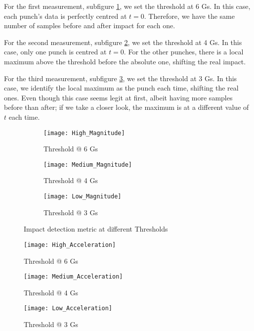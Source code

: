 For the first measurement, subfigure \ref{fig:high_mag}, we set the threshold at 6 Gs. In this case, each punch's data is perfectly centred at $t = 0$. Therefore, we have the same number of samples before and after impact for each one.

For the second measurement, subfigure \ref{fig:medium_mag}, we set the threshold at 4 Gs. In this case, only one punch is centred at $t = 0$. For the other punches, there is a local maximum above the threshold before the absolute one, shifting the real impact.

For the third measurement, subfigure \ref{fig:low_mag}, we set the threshold at 3 Gs. In this case, we identify the local maximum as the punch each time, shifting the real ones. Even though this case seems legit at first, albeit having more samples before than after; if we take a closer look, the maximum is at a different value of $t$ each time.
\begin{figure}[hbt!]
	\begin{subfigure}{1\linewidth}
		\centering
		\texttt{[image: High\_Magnitude]}
		\caption{Threshold @ 6 Gs}
		\label{fig:high_mag}
	\end{subfigure}
	\begin{subfigure}{1\linewidth}
		\centering
		\texttt{[image: Medium\_Magnitude]}
		\caption{Threshold @ 4 Gs}
		\label{fig:medium_mag}
	\end{subfigure}
	\begin{subfigure}{1\linewidth}
		\centering
		\texttt{[image: Low\_Magnitude]}
		\caption{Threshold @ 3 Gs}
		\label{fig:low_mag}
	\end{subfigure}
	\caption{Impact detection metric at different Thresholds}
	\label{fig:impact_mag}
\end{figure}

\begin{figure}[hbt!]
	\centering
	\texttt{[image: High\_Acceleration]}
	\caption{Threshold @ 6 Gs}
	\label{fig:high_acc}
\end{figure}
\begin{figure}[hbt!]
	\centering
	\texttt{[image: Medium\_Acceleration]}
	\caption{Threshold @ 4 Gs}
	\label{fig:medium_acc}
\end{figure}
\begin{figure}[hbt!]
	\centering
	\texttt{[image: Low\_Acceleration]}
	\caption{Threshold @ 3 Gs}
	\label{fig:low_acc}
\end{figure}

